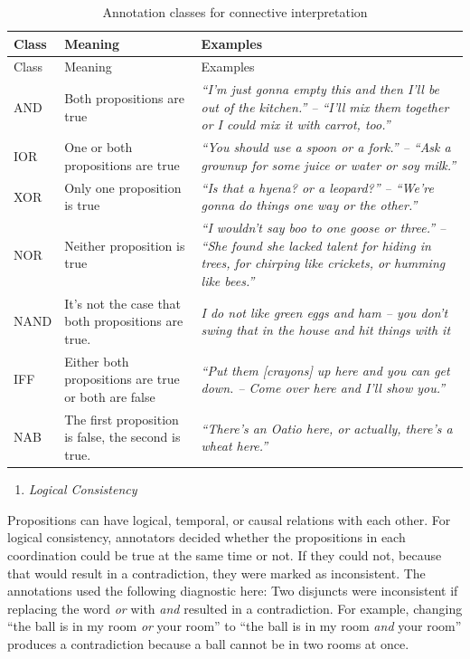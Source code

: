 \documentclass[
  english,
  ,man,floatsintext]{apa6}
\providecommand{\tightlist}{%
  \setlength{\itemsep}{0pt}\setlength{\parskip}{0pt}}
\begin{document}
\begin{longtable}[]{@{}
  >{\raggedright\arraybackslash}p{}
  >{\raggedright\arraybackslash}p{}
  >{\raggedright\arraybackslash}p{}@{}}
\caption{\label{tab:connectiveInterpretaion} Annotation classes for connective interpretation}\tabularnewline
\toprule
Class & Meaning & Examples \\
\midrule
\endfirsthead
\toprule
Class & Meaning & Examples \\
\midrule
\endhead
AND & Both propositions are true & \emph{``I'm just gonna empty this and then I'll be out of the kitchen.'' -- ``I'll mix them together or I could mix it with carrot, too.''} \\
IOR & One or both propositions are true & \emph{``You should use a spoon or a fork.'' -- ``Ask a grownup for some juice or water or soy milk.''} \\
XOR & Only one proposition is true & \emph{``Is that a hyena? or a leopard?'' -- ``We're gonna do things one way or the other.''} \\
NOR & Neither proposition is true & \emph{``I wouldn't say boo to one goose or three.'' -- ``She found she lacked talent for hiding in trees, for chirping like crickets, or humming like bees.''} \\
NAND & It's not the case that both propositions are true. & \emph{I do not like green eggs and ham -- you don't swing that in the house and hit things with it} \\
IFF & Either both propositions are true or both are false & \emph{``Put them {[}crayons{]} up here and you can get down. -- Come over here and I'll show you.''} \\
NAB & The first proposition is false, the second is true. & \emph{``There's an Oatio here, or actually, there's a wheat here.''} \\
\bottomrule
\end{longtable}

\begin{enumerate}
\def\labelenumi{\arabic{enumi}.}
\setcounter{enumi}{1}
\tightlist
\item
  \emph{Logical Consistency}
\end{enumerate}

Propositions can have logical, temporal, or causal relations with each other. For logical consistency, annotators decided whether the propositions in each coordination could be true at the same time or not. If they could not, because that would result in a contradiction, they were marked as inconsistent. The annotations used the following diagnostic here: Two disjuncts were inconsistent if replacing the word \emph{or} with \emph{and} resulted in a contradiction. For example, changing ``the ball is in my room \emph{or} your room'' to ``the ball is in my room \emph{and} your room'' produces a contradiction because a ball cannot be in two rooms at once.
\end{document}
